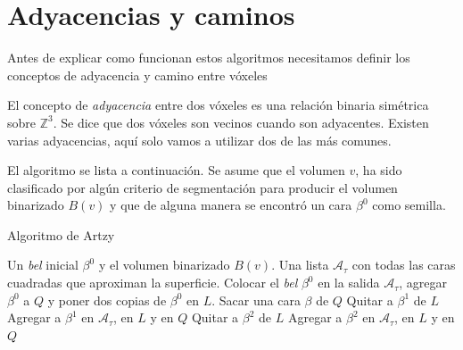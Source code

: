 \section{Adyacencias y caminos}

Antes de explicar como funcionan estos algoritmos necesitamos definir los conceptos de adyacencia y camino entre vóxeles

El concepto de \emph{adyacencia} entre dos vóxeles es una relación binaria simétrica sobre $\mathbb{Z}^3$. Se dice que dos vóxeles son vecinos cuando son adyacentes. Existen varias adyacencias, aquí solo vamos a utilizar dos de las más comunes.

El algoritmo se lista a continuación. Se asume que el volumen $v$, ha sido clasificado por algún criterio de segmentación para producir el volumen binarizado $B(v)$ y que de alguna manera se encontró un cara $\beta^0$ como semilla.

\begin{algorithm}[H]
\caption{Algoritmo de Artzy}
\label{algo:artzy}
\begin{algorithmic}[1]
\REQUIRE Un \emph{bel} inicial $\beta^0$ y el volumen binarizado $B(v)$.
\ENSURE Una lista $\mathcal{A}_{\tau}$ con todas las caras cuadradas que aproximan la superficie.
\STATE Colocar el \emph{bel} $\beta^0$ en la salida $\mathcal{A}_{\tau}$, agregar $\beta^0$ a $Q$ y poner dos copias de $\beta^0$ en $L$.
  \STATE Sacar una cara $\beta$ de $Q$
    \STATE Quitar a $\beta^1$ de $L$
  \ELSE
    \STATE Agregar a $\beta^1$ en $\mathcal{A}_{\tau}$, en $L$ y en $Q$
  \ENDIF
    \STATE Quitar a $\beta^2$ de $L$
  \ELSE
    \STATE Agregar a $\beta^2$ en $\mathcal{A}_{\tau}$, en $L$ y en $Q$
  \ENDIF
\ENDWHILE

\end{algorithmic}
\end{algorithm}
